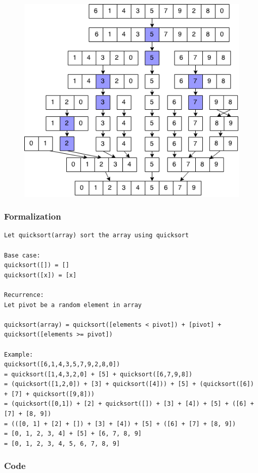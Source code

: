 \documentclass[11pt,oneside]{book}
\makeatletter
\def\maxwidth#1{\ifdim\Gin@nat@width>#1 #1\else\Gin@nat@width\fi}
\makeatother
\begin{document}
\vspace{5px}\begin{figure}[H]\centering
        \includegraphics[width=0.66\maxwidth{\textwidth}]{quicksort.png}
        \end{figure}

\subsubsection{Formalization}

\begin{lstlisting}
Let quicksort(array) sort the array using quicksort

Base case:
quicksort([]) = []
quicksort([x]) = [x]

Recurrence:
Let pivot be a random element in array

quicksort(array) = quicksort([elements < pivot]) + [pivot] + quicksort([elements >= pivot])

Example:
quicksort([6,1,4,3,5,7,9,2,8,0])
= quicksort([1,4,3,2,0] + [5] + quicksort([6,7,9,8])
= (quicksort([1,2,0]) + [3] + quicksort([4])) + [5] + (quicksort([6]) + [7] + quicksort([9,8]))
= (quicksort([0,1]) + [2] + quicksort([]) + [3] + [4]) + [5] + ([6] + [7] + [8, 9])
= (([0, 1] + [2] + []) + [3] + [4]) + [5] + ([6] + [7] + [8, 9])
= [0, 1, 2, 3, 4] + [5] + [6, 7, 8, 9]
= [0, 1, 2, 3, 4, 5, 6, 7, 8, 9]
\end{lstlisting}

\subsubsection{Code}
\end{document}
